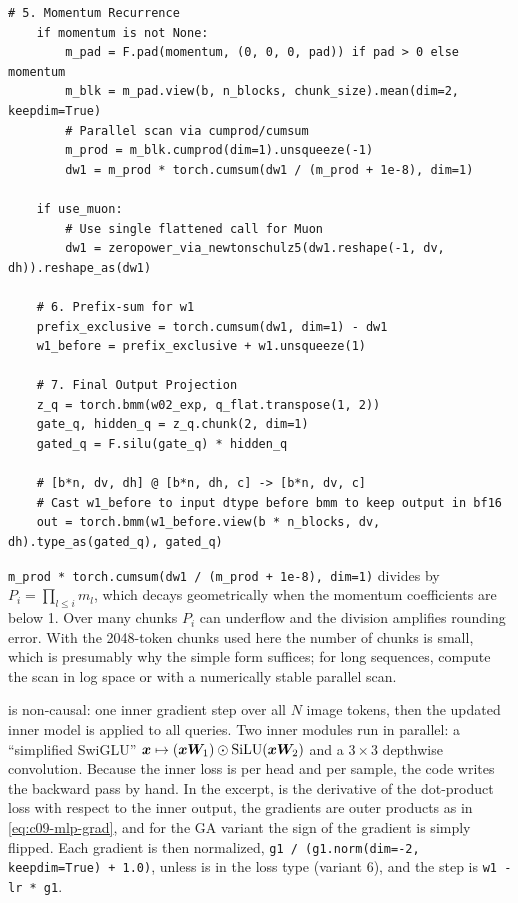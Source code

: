 \begin{lstlisting}[caption={Excerpt from \texttt{repos/\allowbreak{}JunchenLiu77\_\_LaCT/\allowbreak{}lact\_llm/\allowbreak{}lact\_model/\allowbreak{}\_ttt\_operation\_impl/\allowbreak{}only\_w1\_no\_wn\_parallel.py}},label={lst:c09-lact-parallel}]
    # 5. Momentum Recurrence
    if momentum is not None:
        m_pad = F.pad(momentum, (0, 0, 0, pad)) if pad > 0 else momentum
        m_blk = m_pad.view(b, n_blocks, chunk_size).mean(dim=2, keepdim=True)
        # Parallel scan via cumprod/cumsum
        m_prod = m_blk.cumprod(dim=1).unsqueeze(-1)
        dw1 = m_prod * torch.cumsum(dw1 / (m_prod + 1e-8), dim=1)

    if use_muon:
        # Use single flattened call for Muon
        dw1 = zeropower_via_newtonschulz5(dw1.reshape(-1, dv, dh)).reshape_as(dw1)

    # 6. Prefix-sum for w1
    prefix_exclusive = torch.cumsum(dw1, dim=1) - dw1
    w1_before = prefix_exclusive + w1.unsqueeze(1)

    # 7. Final Output Projection
    z_q = torch.bmm(w02_exp, q_flat.transpose(1, 2))
    gate_q, hidden_q = z_q.chunk(2, dim=1)
    gated_q = F.silu(gate_q) * hidden_q

    # [b*n, dv, dh] @ [b*n, dh, c] -> [b*n, dv, c]
    # Cast w1_before to input dtype before bmm to keep output in bf16
    out = torch.bmm(w1_before.view(b * n_blocks, dv, dh).type_as(gated_q), gated_q)
\end{lstlisting}

\begin{pitfall}[title={Pitfall: the cumulative-product trick}]
\texttt{m\_prod * torch.cumsum(dw1 / (m\_prod + 1e-8), dim=1)} divides by $P_i = \prod_{l\le i}m_l$,
which decays geometrically when the momentum coefficients are below 1. Over many chunks $P_i$
can underflow and the division amplifies rounding error. With the 2048-token chunks used here
the number of chunks is small, which is presumably why the simple form suffices; for long
sequences, compute the scan in log space or with a numerically stable parallel scan.
\end{pitfall}

\begin{implnote}[title={In the code: the vision version (ViTTT)}]
 is non-causal: one inner gradient step over all $N$ image
tokens, then the updated inner model is applied to all queries. Two inner modules run in
parallel: a ``simplified SwiGLU'' $\bm{x} \mapsto (\bm{x}\bm{W}_1)\odot\operatorname{SiLU}(\bm{x}\bm{W}_2)$ and a $3\times3$
depthwise convolution. Because the inner loss is per head and per sample, the code writes the
backward pass by hand. In the excerpt,  is the derivative of the dot-product loss with
respect to the inner output, the gradients are outer products as in \eqref{eq:c09-mlp-grad}, and
for the GA variant the sign of the gradient is simply flipped. Each gradient is then normalized,
\texttt{g1 / (g1.norm(dim=-2, keepdim=True) + 1.0)}, unless  is in the loss type
(variant 6), and the step is \texttt{w1 - lr * g1}.
\end{implnote}

